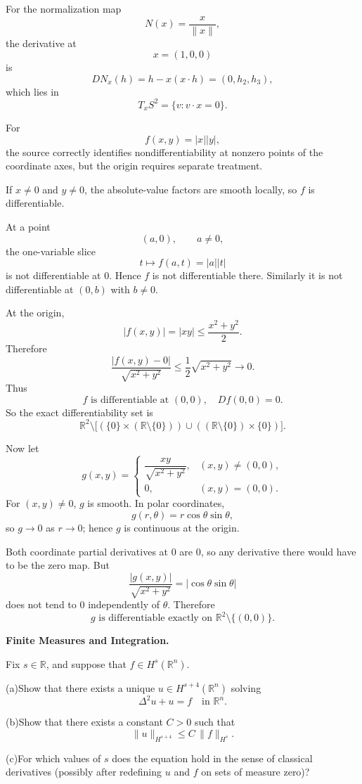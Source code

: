 \begin{solution}
For the normalization map
\[
N(x)=\frac{x}{\|x\|},
\]
the derivative at
\[
x=(1,0,0)
\]
is
\[
DN_x(h)
=
h-x(x\cdot h)
=
(0,h_2,h_3),
\]
which lies in
\[
T_xS^2=\{v:v\cdot x=0\}.
\]

For
\[
f(x,y)=|x||y|,
\]
the source correctly identifies nondifferentiability at nonzero points of the coordinate
axes, but the origin requires separate treatment.

If \(x\neq0\) and \(y\neq0\), the absolute-value factors are smooth locally, so \(f\) is
differentiable.

At a point
\[
(a,0),\qquad a\neq0,
\]
the one-variable slice
\[
t\longmapsto f(a,t)=|a||t|
\]
is not differentiable at \(0\). Hence \(f\) is not differentiable there. Similarly it is
not differentiable at \((0,b)\) with \(b\neq0\).

At the origin,
\[
|f(x,y)|
=
|xy|
\le
\frac{x^2+y^2}{2}.
\]
Therefore
\[
\frac{|f(x,y)-0|}{\sqrt{x^2+y^2}}
\le
\frac12\sqrt{x^2+y^2}\to0.
\]
Thus
\[
\boxed{
f\text{ is differentiable at }(0,0),\quad Df(0,0)=0.
}
\]
So the exact differentiability set is
\[
\boxed{
\mathbb R^2
\setminus
\bigl[
(\{0\}\times(\mathbb R\setminus\{0\}))
\cup
((\mathbb R\setminus\{0\})\times\{0\})
\bigr].
}
\]

Now let
\[
g(x,y)
=
\begin{cases}
\dfrac{xy}{\sqrt{x^2+y^2}},&(x,y)\neq(0,0),\\[1ex]
0,&(x,y)=(0,0).
\end{cases}
\]
For \((x,y)\neq0\), \(g\) is smooth. In polar coordinates,
\[
g(r,\theta)=r\cos\theta\sin\theta,
\]
so \(g\to0\) as \(r\to0\); hence \(g\) is continuous at the origin.

Both coordinate partial derivatives at \(0\) are \(0\), so any derivative there would have
to be the zero map. But
\[
\frac{|g(x,y)|}{\sqrt{x^2+y^2}}
=
|\cos\theta\sin\theta|
\]
does not tend to \(0\) independently of \(\theta\). Therefore
\[
\boxed{
g\text{ is differentiable exactly on }\mathbb R^2\setminus\{(0,0)\}.
}
\]
\end{solution}


\begin{problem}[CP-II-0371]
\label{prob:cp-ii-0371}
\textbf{Finite Measures and Integration.}

\hspace*{1.5em}Fix $s\in\mathbb R$, and suppose that $f\in H^s(\mathbb R^n)$.

	\par\noindent (a)\quad Show that there exists a unique $u\in H^{s+4}(\mathbb R^n)$ solving
	\[
	\Delta^2 u + u = f \quad\text{in }\mathbb R^n.
	\]
	\par\noindent (b)\quad Show that there exists a constant $C>0$ such that
	\[
	\|u\|_{H^{s+4}} \le C\,\|f\|_{H^s}.
	\]
	\par\noindent (c)\quad For which values of $s$ does the equation hold in the sense of classical derivatives
	(possibly after redefining $u$ and $f$ on sets of measure zero)?
\end{problem}

